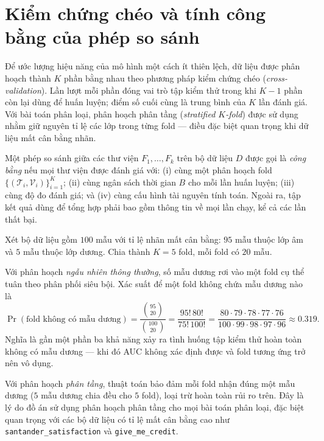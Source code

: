 \section{Kiểm chứng chéo và tính công bằng của phép so sánh}
\label{sec:cv}
Để ước lượng hiệu năng của mô hình một cách ít thiên lệch, dữ liệu được phân
hoạch thành $K$ phần bằng nhau theo phương pháp kiểm chứng chéo
(\textit{cross-validation}). Lần lượt mỗi phần đóng vai trò tập kiểm thử trong khi
$K-1$ phần còn lại dùng để huấn luyện; điểm số cuối cùng là trung bình của $K$ lần
đánh giá. Với bài toán phân loại, phân hoạch phân tầng
(\textit{stratified $K$-fold}) được sử dụng nhằm giữ nguyên tỉ lệ các lớp trong
từng fold --- điều đặc biệt quan trọng khi dữ liệu mất cân bằng nhãn.

\begin{dinhnghia}
\label{def:congbang}
Một phép so sánh giữa các thư viện $F_1, \dots, F_k$ trên bộ dữ liệu $D$ được gọi
là \emph{công bằng} nếu mọi thư viện được đánh giá với: (i) cùng một phân hoạch
fold $\{(\mathcal{T}_i, \mathcal{V}_i)\}_{i=1}^{K}$; (ii) cùng ngân sách thời gian
$B$ cho mỗi lần huấn luyện; (iii) cùng độ đo đánh giá; và (iv) cùng cấu hình tài
nguyên tính toán. Ngoài ra, tập kết quả dùng để tổng hợp phải bao gồm thông tin về
mọi lần chạy, kể cả các lần thất bại.
\end{dinhnghia}

\begin{vidu}
\label{vd:stratified}
Xét bộ dữ liệu gồm $100$ mẫu với tỉ lệ nhãn mất cân bằng: $95$ mẫu thuộc lớp âm và
$5$ mẫu thuộc lớp dương. Chia thành $K = 5$ fold, mỗi fold có $20$ mẫu.

Với phân hoạch \emph{ngẫu nhiên thông thường}, số mẫu dương rơi vào một fold cụ
thể tuân theo phân phối siêu bội. Xác suất để một fold không chứa mẫu dương nào là
\[
    \Pr(\text{fold không có mẫu dương}) = \frac{\binom{95}{20}}{\binom{100}{20}}
    = \frac{95!\,80!}{75!\,100!} = \frac{80 \cdot 79 \cdot 78 \cdot 77 \cdot 76}
    {100 \cdot 99 \cdot 98 \cdot 97 \cdot 96} \approx 0.319.
\]
Nghĩa là gần một phần ba khả năng xảy ra tình huống tập kiểm thử hoàn toàn không
có mẫu dương --- khi đó AUC không xác định được và fold tương ứng trở nên vô dụng.

Với phân hoạch \emph{phân tầng}, thuật toán bảo đảm mỗi fold nhận đúng một mẫu
dương ($5$ mẫu dương chia đều cho $5$ fold), loại trừ hoàn toàn rủi ro trên. Đây
là lý do đồ án sử dụng phân hoạch phân tầng cho mọi bài toán phân loại, đặc biệt
quan trọng với các bộ dữ liệu có tỉ lệ mất cân bằng cao như
\texttt{santander\_satisfaction} và \texttt{give\_me\_credit}.
\end{vidu}

